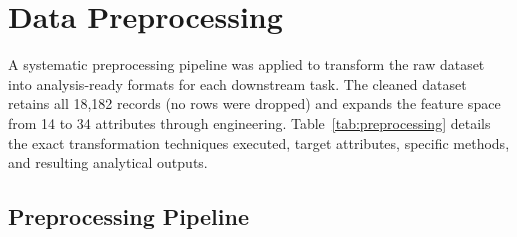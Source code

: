 \documentclass[12pt,a4paper]{article}
\begin{document}
\section{Data Preprocessing}

A systematic preprocessing pipeline was applied to transform the raw dataset into analysis-ready formats for each downstream task. The cleaned dataset retains all 18{,}182 records (no rows were dropped) and expands the feature space from 14 to 34 attributes through engineering. Table~\ref{tab:preprocessing} details the exact transformation techniques executed, target attributes, specific methods, and resulting analytical outputs.

\subsection{Preprocessing Pipeline}
\end{document}
